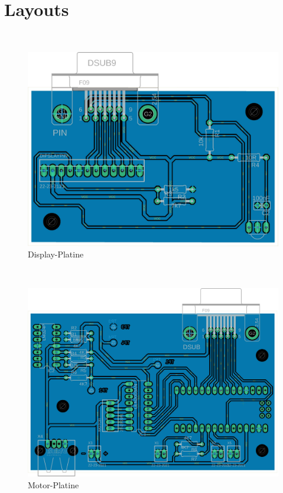 \documentclass[11pt, titlepage, fleqn]{report}
\begin{document}
		\section{Layouts}
			~
			~
			\begin{figure}[!htbp]
				\centering
				\includegraphics[height=0.9\linewidth ,angle=90]{./docs/Display_LayoutW.pdf}
				\caption{Display-Platine}
			\end{figure}
			\newpage
			~
			~
			~
			\begin{figure}[!htbp]
				\centering
				\includegraphics[height=0.9\linewidth ,angle=90]{./docs/Motor_LayoutW.pdf}
				\caption{Motor-Platine}
			\end{figure}
\end{document}
